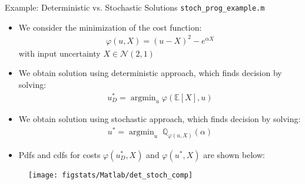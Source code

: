 \documentclass[handout,9pt]{beamer}
\begin{document}
%
\begin{frame}{Example: Deterministic vs. Stochastic Solutions \footnotesize{\texttt{stoch\_prog\_example.m}}}

\begin{itemize}
\setlength{\itemsep}{5pt}
\item We consider the minimization of the cost function:
\begin{align*}
\varphi(u,X)=(u-X)^2-e^{\alpha X}
\end{align*}
with  input uncertainty $X\in \mathcal{N}(2,1)$
\item We obtain solution using deterministic approach, which finds decision by solving:
\begin{align*}
u_D^*=\mathop{\textrm{argmin}}_{u}\varphi (\mathbb{E}[X],u)
\end{align*}
\item We obtain solution using stochastic approach, which finds decision by solving:
\begin{align*}
u^*=\mathop{\textrm{argmin}}_u\; \mathbb{Q}_{\varphi(u,X)}(\alpha)
\end{align*}
\item Pdfs and cdfs for costs $\varphi(u^*_D,X)$ and $\varphi(u^*,X)$ are shown below:
\end{itemize}
\vspace{-0.1in}
\begin{figure}[!htb]
    \centering
	\texttt{[image: figstats/Matlab/det\_stoch\_comp]}
\end{figure}

\end{frame}

% 
\end{document}
